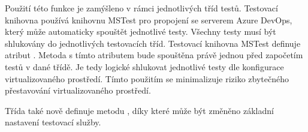 Použití této funkce je zamýšleno v rámci jednotlivých tříd testů. Testovací knihovna používá knihovnu MSTest pro propojení se serverem Azure DevOps, který může automaticky spouštět jednotlivé testy. Všechny testy musí být shlukovány do jednotlivých testovacích tříd. Testovací knihovna MSTest definuje atribut . Metoda s tímto atributem bude spouštěna právě jednou před započetím testů v dané třídě. Je tedy logické shlukovat jednotlivé testy dle konfigurace virtualizovaného prostředí. Tímto použitím se minimalizuje riziko zbytečného přestavování virtualizovaného prostředí. 

Třída  také nově definuje metodu , díky které může být změněno základní nastavení testovací služby. 


